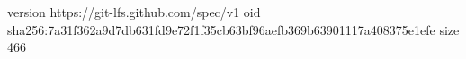 version https://git-lfs.github.com/spec/v1
oid sha256:7a31f362a9d7db631fd9e72f1f35cb63bf96aefb369b63901117a408375e1efe
size 466

